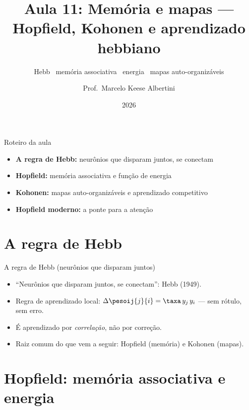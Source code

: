 \documentclass[aspectratio=169, 11pt]{beamer}
\title[Aula 11 — Hopfield e Kohonen]{Aula 11: Memória e mapas — Hopfield, Kohonen e aprendizado hebbiano}
\subtitle[GBC073 — Inteligência Computacional]{Hebb \textbullet\ memória associativa \textbullet\ energia \textbullet\ mapas auto-organizáveis}
\author[Prof.\ Marcelo Albertini]{Prof.\ Marcelo Keese Albertini}
\institute{GBC073 — Inteligência Computacional \textbullet\ Universidade Federal de Uberlândia}
\date{2026}
\begin{document}
\begin{frame}
  \titlepage
\end{frame}

\begin{frame}{Roteiro da aula}
  \begin{itemize}\setlength{\itemsep}{0.5ex}
    \item<1-> \textbf{A regra de Hebb:} neurônios que disparam juntos, se conectam
    \item<2-> \textbf{Hopfield:} memória associativa e função de energia
    \item<3-> \textbf{Kohonen:} mapas auto-organizáveis e aprendizado competitivo
    \item<4-> \textbf{Hopfield moderno:} a ponte para a atenção
  \end{itemize}
\end{frame}

\section{A regra de Hebb}

\begin{frame}{A regra de Hebb (neurônios que disparam juntos)}
  \begin{itemize}\setlength{\itemsep}{0.4ex}
    \item ``Neurônios que disparam juntos, se conectam'': Hebb (1949).
    \item Regra de aprendizado local: \(\Delta \pesoij{j}{i} = \taxa\, y_j\, y_i\)
          — sem rótulo, sem erro.
    \item É aprendizado por \emph{correlação}, não por correção.
    \item Raiz comum do que vem a seguir: Hopfield (memória) e Kohonen
          (mapas).
  \end{itemize}
\end{frame}

\section{Hopfield: memória associativa e energia}
\end{document}
